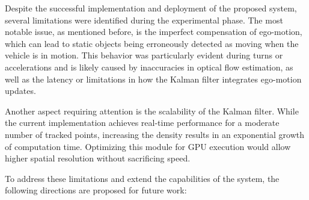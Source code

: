 Despite the successful implementation and deployment of the proposed system, 
several limitations were identified during the experimental phase. The most 
notable issue, as mentioned before, is the imperfect compensation of ego-motion, which can lead 
to static objects being erroneously detected as moving when the vehicle is in 
motion. This behavior was particularly evident during turns or accelerations and 
is likely caused by inaccuracies in optical flow estimation, as well as the 
latency or limitations in how the Kalman filter integrates ego-motion updates.

Another aspect requiring attention is the scalability of the Kalman filter. While 
the current implementation achieves real-time performance for a moderate number 
of tracked points, increasing the density results in an exponential growth of 
computation time. Optimizing this module for GPU execution would allow higher 
spatial resolution without sacrificing speed.

To address these limitations and extend the capabilities of the system, the 
following directions are proposed for future work:

